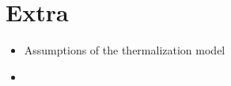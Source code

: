 \section{Extra}
\begin{frame}
\begin{itemize}
\item Assumptions of the thermalization model
\item 
\end{itemize}
\end{frame}